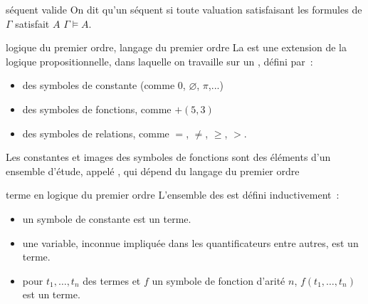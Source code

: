 \begin{definition}{7.19}{séquent valide}
    On dit qu'un séquent  si toute valuation satisfaisant les formules de $\Gamma$ satisfait $A$ \ie $\Gamma \models A$.
\end{definition}

\begin{definition}{7.20}{logique du premier ordre, langage du premier ordre}
    La  est une extension de la logique propositionnelle, dans laquelle on travaille sur un , défini par~:
    \begin{itemize}
        \item des symboles de constante (comme $0$, $\varnothing$, $\pi$,...)
        \item des symboles de fonctions, comme $+ (5,3)$
        \item des symboles de relations, comme $=$, $\neq$, $\geq$, $>$.
    \end{itemize}
    Les constantes et images des symboles de fonctions sont des éléments d'un ensemble d'étude, appelé , qui dépend du langage du premier ordre
\end{definition}

\begin{definition}{7.21}{terme en logique du premier ordre}
    L'ensemble des  est défini inductivement~:
    \begin{itemize}
        \item un symbole de constante est un terme.
        \item une variable, inconnue impliquée dans les quantificateurs entre autres, est un terme.
        \item pour $t_1, \dots, t_n$ des termes et $f$ un symbole de fonction d'arité $n$, $f(t_1, \dots, t_n)$ est un terme.
    \end{itemize}
\end{definition}

